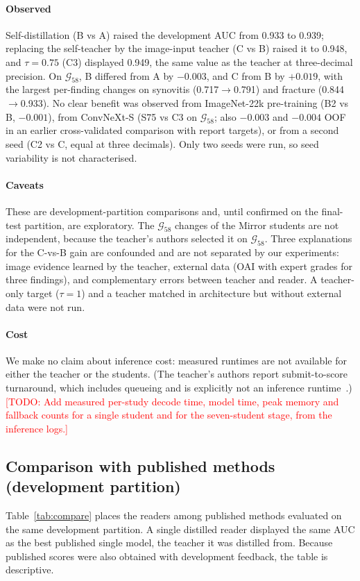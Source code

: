 \documentclass{ieeeaccess}
\newcommand{\TODO}[1]{\textcolor{red}{[TODO: #1]}}
\newcommand{\gold}{$\mathcal{G}_{58}$}
\begin{document}
\paragraph*{Observed} Self-distillation (B vs A) raised the development AUC from 0.933 to 0.939; replacing the
self-teacher by the image-input teacher (C vs B) raised it to 0.948, and $\tau=0.75$ (C3) displayed 0.949, the same value
as the teacher at three-decimal precision. On \gold, B differed from A by $-0.003$, and C from B by $+0.019$, with the largest
per-finding changes on synovitis (0.717$\to$0.791) and fracture (0.844$\to$0.933). No clear benefit was observed from
ImageNet-22k pre-training (B2 vs B, $-0.001$), from ConvNeXt-S (S75 vs C3 on \gold; also $-0.003$ and $-0.004$ OOF in an
earlier cross-validated comparison with report targets), or from a second seed (C2 vs C, equal at three decimals). Only
two seeds were run, so seed variability is not characterised.

\paragraph*{Caveats} These are development-partition comparisons and, until confirmed on the final-test partition, are
exploratory. The \gold{} changes of the Mirror students are not independent, because the teacher's authors selected it on
\gold. Three explanations for the C-vs-B gain are confounded and are not separated by our experiments: image evidence
learned by the teacher, external data (OAI with expert grades for three findings), and complementary errors between
teacher and reader. A teacher-only target ($\tau=1$) and a teacher matched in architecture but without external data were
not run.

\paragraph*{Cost} We make no claim about inference cost: measured runtimes are not available for either the teacher or
the students. (The teacher's authors report submit-to-score turnaround, which includes queueing and is explicitly not
an inference runtime~\cite{nartaa2026mirror}.) \TODO{Add measured per-study decode time, model time, peak memory and
fallback counts for a single student and for the seven-student stage, from the inference logs.}

\subsection{Comparison with published methods (development partition)}
\label{sec:res-compare}
Table~\ref{tab:compare} places the readers among published methods evaluated on the same development partition. A single
distilled reader displayed the same AUC as the best published single model, the teacher it was distilled from. Because
published scores were also obtained with development feedback, the table is descriptive.
\end{document}
